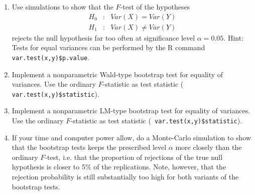 \documentclass{article}
\begin{document}
\begin{enumerate}
\item Use simulations to show that the $F$-test of the hypotheses%
\begin{eqnarray*}
H_{0} &:&Var(X)=Var(Y) \\
H_{1} &:&Var(X)\neq Var(Y)
\end{eqnarray*}%
rejects the null hypothesis far too often at significance level $\alpha
=0.05 $. Hint: Tests for equal variances can be performed by the R command
\texttt{var.test(x,y)\$p.value}.

\item Implement a nonparametric Wald-type bootstrap test for equality of
variances. Use the ordinary $F$-statistic as test statistic (\texttt{%
var.test(x,y)\$statistic}).

\item Implement a nonparametric LM-type bootstrap test for equality of
variances. Use the ordinary $F$-statistic as test statistic (\texttt{%
var.test(x,y)\$statistic}).

\item If your time and computer power allow, do a Monte-Carlo simulation to
show that the bootstrap tests keeps the prescribed level $\alpha $ more
closely than the ordinary $F$-test, i.e. that the proportion of rejections
of the true null hypothesis is closer to 5\% of the replications. Note,
however, that the rejection probability is still substantially too high for
both variants of the bootstrap tests.
\end{enumerate}
\end{document}
